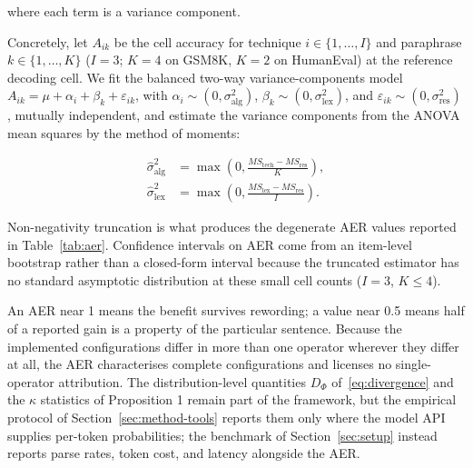 \documentclass[conference]{IEEEtran}
\begin{document}
where each term is a variance component.

Concretely, let $A_{ik}$ be the cell accuracy for technique
$i \in \{1,\dots,I\}$ and paraphrase $k \in \{1,\dots,K\}$ ($I = 3$;
$K = 4$ on GSM8K, $K = 2$ on HumanEval) at the reference decoding
cell.  We fit the balanced two-way variance-components model $A_{ik}
= \mu + \alpha_i + \beta_k + \varepsilon_{ik}$, with $\alpha_i \sim
(0, \sigma_{\mathrm{alg}}^2)$, $\beta_k \sim (0,
\sigma_{\mathrm{lex}}^2)$, and $\varepsilon_{ik} \sim (0,
\sigma_{\mathrm{res}}^2)$, mutually independent, and estimate the
variance components from the ANOVA mean squares by the method of
moments:

\begin{equation}
\begin{split}
\hat{\sigma}_{\mathrm{alg}}^{2} &= \max\!\left(0, \frac{MS_{\mathrm{tech}} - MS_{\mathrm{res}}}{K}\right),\\
\hat{\sigma}_{\mathrm{lex}}^{2} &= \max\!\left(0, \frac{MS_{\mathrm{lex}} - MS_{\mathrm{res}}}{I}\right).
\end{split}
\label{eq:varcomp}
\end{equation}

Non-negativity truncation is what produces the degenerate AER values
reported in Table~\ref{tab:aer}.  Confidence intervals on AER come
from an item-level bootstrap rather than a closed-form interval
because the truncated estimator has no standard asymptotic
distribution at these small cell counts ($I = 3$, $K \le 4$).

An AER near 1 means the
benefit survives rewording; a value near 0.5 means half of a reported
gain is a property of the particular sentence.  Because the
implemented configurations differ in more than one operator wherever
they differ at all, the AER characterises complete configurations and
licenses no single-operator attribution.  The distribution-level
quantities $D_{\Phi}$ of~\eqref{eq:divergence} and the $\kappa$
statistics of Proposition 1 remain part of the framework, but the
empirical protocol of Section~\ref{sec:method-tools} reports them
only where the model API supplies per-token probabilities; the
benchmark of Section~\ref{sec:setup} instead reports parse rates,
token cost, and latency alongside the AER.
\end{document}
